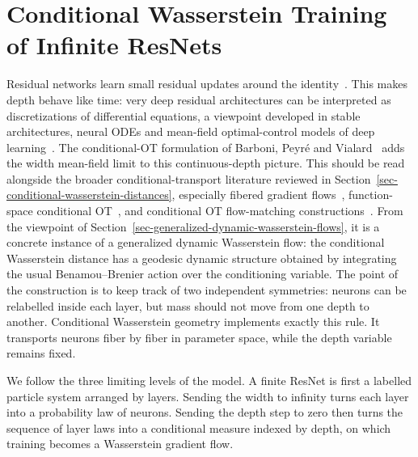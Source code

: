 \section{Conditional Wasserstein Training of Infinite ResNets}
\label{sec-conditional-wasserstein-resnets}
Residual networks learn small residual updates around the identity~\cite{HeZhangRenSun2016ResNet}. This makes depth behave like time: very deep residual architectures can be interpreted as discretizations of differential equations, a viewpoint developed in stable architectures, neural ODEs and mean-field optimal-control models of deep learning~\cite{HaberRuthotto2017StableArchitectures,LuZhongLiDong2018BeyondFiniteLayers,Chen2018NeuralODE,EHanLi2019MeanFieldDeepLearning}. The conditional-OT formulation of Barboni, Peyr\'e and Vialard~\cite{BarboniPeyreVialard2024ConditionalResNets} adds the width mean-field limit to this continuous-depth picture. This should be read alongside the broader conditional-transport literature reviewed in Section~\ref{sec-conditional-wasserstein-distances}, especially fibered gradient flows~\cite{PeszekPoyato2023FiberedOptimalTransport}, function-space conditional OT~\cite{HosseiniHsuTaghvaei2023ConditionalFunctionSpaces}, and conditional OT flow-matching constructions~\cite{ChemseddineHagemannSteidlWald2024ConditionalWasserstein,KerriganMiglioriniSmyth2024DynamicConditionalOT}. From the viewpoint of Section~\ref{sec-generalized-dynamic-wasserstein-flows}, it is a concrete instance of a generalized dynamic Wasserstein flow: the conditional Wasserstein distance has a geodesic dynamic structure obtained by integrating the usual Benamou--Brenier action over the conditioning variable. The point of the construction is to keep track of two independent symmetries: neurons can be relabelled inside each layer, but mass should not move from one depth to another. Conditional Wasserstein geometry implements exactly this rule. It transports neurons fiber by fiber in parameter space, while the depth variable remains fixed.

We follow the three limiting levels of the model. A finite ResNet is first a labelled particle system arranged by layers. Sending the width to infinity turns each layer into a probability law of neurons. Sending the depth step to zero then turns the sequence of layer laws into a conditional measure indexed by depth, on which training becomes a Wasserstein gradient flow.

